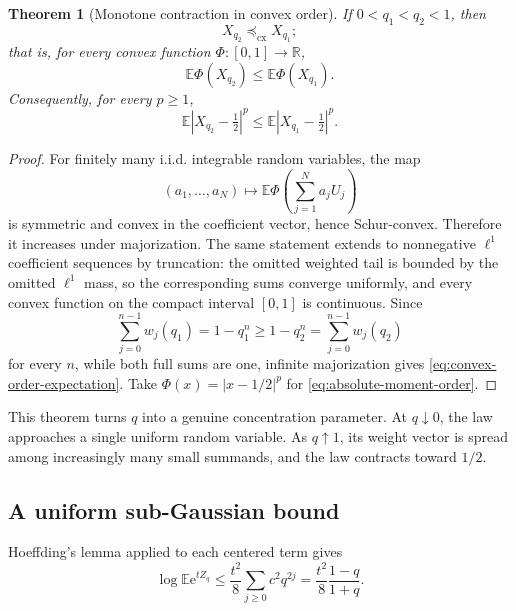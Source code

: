 \documentclass[11pt,oneside]{article}
\newtheorem{theorem}{Theorem}[section]
\theoremstyle{definition}
\theoremstyle{remark}
\newcommand{\R}{\mathbb R}
\newcommand{\E}{\mathbb E}
\newcommand{\e}{\mathrm e}
\newcommand{\convexorder}{\preceq_{\mathrm{cx}}}
\begin{document}
\begin{theorem}[Monotone contraction in convex order]
\label{thm:convex-order}
If $0<q_1<q_2<1$, then
\begin{equation}
 X_{q_2}\convexorder X_{q_1};                               \label{eq:convex-order}
\end{equation}
that is, for every convex function $\Phi:[0,1]\to\R$,
\begin{equation}
 \E\Phi(X_{q_2})\le\E\Phi(X_{q_1}).                         \label{eq:convex-order-expectation}
\end{equation}
Consequently, for every $p\ge1$,
\begin{equation}
 \E|X_{q_2}-\tfrac12|^p
 \le \E|X_{q_1}-\tfrac12|^p.                               \label{eq:absolute-moment-order}
\end{equation}
\end{theorem}

\begin{proof}
For finitely many i.i.d. integrable random variables, the map
\[
 (a_1,\ldots,a_N)\longmapsto
 \E\Phi\!\left(\sum_{j=1}^Na_jU_j\right)
\]
is symmetric and convex in the coefficient vector, hence Schur-convex.  Therefore it
increases under majorization.  The same statement extends to nonnegative $\ell^1$ coefficient
sequences by truncation: the omitted weighted tail is bounded by the omitted $\ell^1$ mass,
so the corresponding sums converge uniformly, and every convex function on the compact
interval $[0,1]$ is continuous.  Since
\[
 \sum_{j=0}^{n-1}w_j(q_1)=1-q_1^n\ge1-q_2^n
 =\sum_{j=0}^{n-1}w_j(q_2)
\]
for every $n$, while both full sums are one, infinite majorization gives
\eqref{eq:convex-order-expectation}.  Take
$\Phi(x)=|x-1/2|^p$ for \eqref{eq:absolute-moment-order}.
\end{proof}

This theorem turns $q$ into a genuine concentration parameter.  At $q\downarrow0$, the law
approaches a single uniform random variable.  As $q\uparrow1$, its weight vector is spread
among increasingly many small summands, and the law contracts toward $1/2$.

\subsection{A uniform sub-Gaussian bound}

Hoeffding's lemma applied to each centered term gives
\[
 \log\E\e^{tZ_q}
 \le\frac{t^2}{8}\sum_{j\ge0}c^2q^{2j}
 =\frac{t^2}{8}\frac{1-q}{1+q}.
\]
\end{document}
